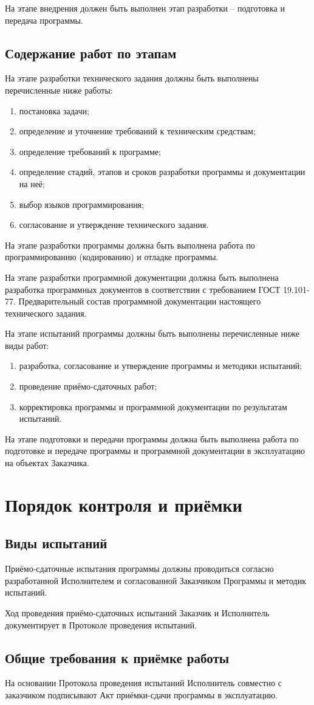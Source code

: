 На этапе внедрения должен быть выполнен этап разработки -- подготовка и передача программы.

\section{Содержание работ по этапам}
На этапе разработки технического задания должны быть выполнены перечисленные ниже работы:
\begin{enumerate}
    \item постановка задачи;
    \item определение и уточнение требований к техническим средствам;
    \item определение требований к программе;
    \item определение стадий, этапов и сроков разработки программы и документации на неё;
    \item выбор языков программирования;
    \item согласование и утверждение технического задания.
\end{enumerate}

На этапе разработки программы должна быть выполнена работа по программированию (кодированию) и отладке 
программы.

На этапе разработки программной документации должна быть выполнена разработка программных документов в 
соответствии с требованием ГОСТ 19.101-77. Предварительный состав программной документации настоящего 
технического задания.

На этапе испытаний программы должны быть выполнены перечисленные ниже виды работ:
\begin{enumerate}
    \item разработка, согласование и утверждение программы и методики испытаний;
    \item проведение приёмо-сдаточных работ;
    \item корректировка программы и программной документации по результатам испытаний.
\end{enumerate}

На этапе подготовки и передачи программы должна быть выполнена работа по подготовке и передаче программы и 
программной документации в эксплуатацию на объектах Заказчика.

\chapter{Порядок контроля и приёмки}
\section{Виды испытаний}
Приёмо-сдаточные испытания программы должны проводиться согласно разработанной Исполнителем и согласованной 
Заказчиком Программы и методик испытаний.

Ход проведения приёмо-сдаточных испытаний Заказчик и Исполнитель документирует в Протоколе проведения 
испытаний.

\section{Общие требования к приёмке работы}
На основании Протокола проведения испытаний Исполнитель совместно с заказчиком подписывают Акт приёмки-сдачи 
программы в эксплуатацию.